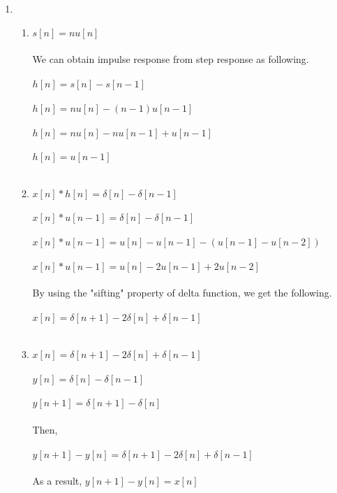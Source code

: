\documentclass[10pt,a4paper, margin=1in]{article}
\begin{document}
\begin{enumerate}
\item %
    \begin{enumerate}
    \item %
    $s[n] = nu[n]$\\\\
    We can obtain impulse response from step response as following.\\\\
    $h[n] = s[n] - s[n-1]$\\\\
    $h[n] = nu[n] - (n-1)u[n-1]$\\\\
    $h[n] = nu[n] - nu[n-1] + u[n-1]$\\\\
    $h[n] = u[n-1]$\\\\
    \item %
    $x[n]*h[n] = \delta[n] - \delta[n-1]$\\\\
    $x[n]*u[n-1] = \delta[n] - \delta[n-1]$\\\\
    $x[n]*u[n-1] = u[n] - u[n-1] - (u[n-1] - u[n-2])$\\\\
    $x[n]*u[n-1] = u[n] - 2u[n-1] + 2u[n-2]$\\\\
    By using the "sifting" property of delta function, we get the following.\\\\
    $x[n] = \delta[n+1] -2\delta[n] + \delta[n-1]$\\\\
    \item %
    $x[n] = \delta[n+1] -2\delta[n] +\delta[n-1]$\\\\
    $y[n] = \delta[n] - \delta[n-1]$\\\\
    $y[n+1] =  \delta[n+1] - \delta[n]$\\\\
    Then,\\\\
    $y[n+1] - y[n] = \delta[n+1] - 2\delta[n] +\delta[n-1]$\\\\
    As a result, $y[n+1] - y[n] = x[n] $\\\\
    \end{enumerate}


\end{enumerate}
\end{document}
